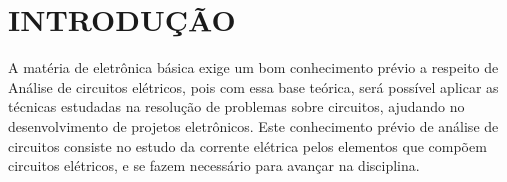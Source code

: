 \chapter{INTRODUÇÃO}

A matéria de eletrônica básica exige um bom conhecimento prévio a respeito de Análise de circuitos elétricos, pois com essa base teórica, será possível aplicar as técnicas estudadas na resolução de problemas sobre circuitos, ajudando no desenvolvimento de projetos eletrônicos. Este conhecimento prévio de análise de circuitos consiste no estudo da corrente elétrica pelos elementos que compõem circuitos elétricos, e se fazem necessário para avançar na disciplina.
